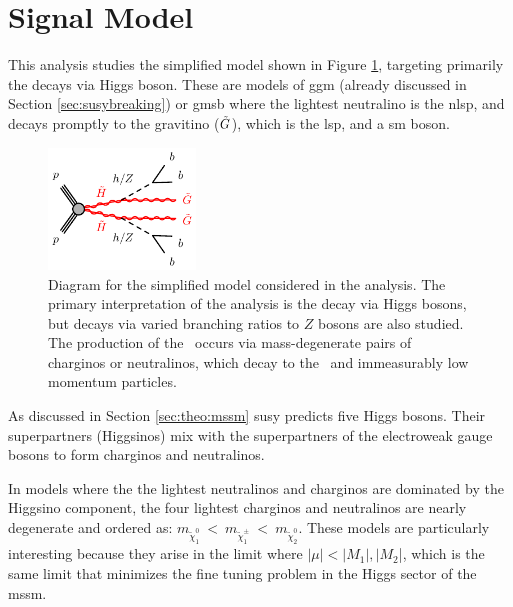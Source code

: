
\section{Signal Model}
\label{sec:ewk:sig}

This analysis studies the simplified model shown in Figure \ref{fig:feyn}, targeting primarily the decays via Higgs boson.
These are models of \gls{ggm} \cite{Meade:2008wd,Cheung:2007es,Dine:1981gu,AlvarezGaume:1981wy,Nappi:1982hm} 
(already discussed in Section \ref{sec:susybreaking})
or \gls{gmsb} \cite{Dimopoulos:1996vz,Matchev:1999ft} where 
the lightest neutralino is the \gls{nlsp}, and decays promptly to the gravitino ($\tilde{G}$), which is the \gls{lsp}, and 
a \gls{sm} boson. 

\begin{figure}[htbp]
	\centering
	\includegraphics[width=0.35\textwidth]{figures/ewk_prod/varie/N1N1-hhGG-bbbb_Z}
	\caption{Diagram for the simplified model considered in the analysis. The primary interpretation of the analysis is the decay via Higgs bosons, but decays via varied branching ratios to $Z$ bosons are also studied. The production of the \hino\ occurs
via mass-degenerate pairs of charginos or neutralinos, which decay to the \ninoone\ and immeasurably low momentum particles.} 
	\label{fig:feyn}
\end{figure}

As discussed in Section \ref{sec:theo:mssm} \gls{susy} predicts five Higgs bosons. 
Their superpartners (Higgsinos) mix with the superpartners of the electroweak gauge bosons to form charginos and neutralinos.

In models where the the lightest neutralinos and charginos are dominated by the Higgsino component, the four lightest charginos 
and neutralinos are nearly degenerate \cite{Papucci:2011wy,Barbieri:2009ev,Han:2014kaa} and ordered as: $m_{\tilde\chi^0_1}~<~m_{\tilde\chi^\pm_1}~<~m_{\tilde\chi^0_2}$.
These models are particularly interesting because they arise in the limit where $|\mu| < |M_1|, |M_2$|, which is the same limit 
that minimizes the fine tuning problem in the Higgs sector of the \gls{mssm}.

